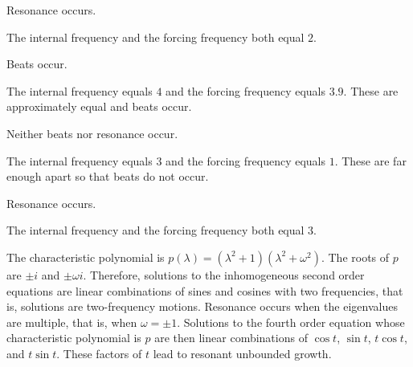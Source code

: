   \ans Resonance occurs.

\soln  The internal frequency and the forcing frequency both equal $2$.

\newpage
{} \ans Beats occur.

\soln  The internal frequency equals $4$ and the forcing frequency equals
$3.9$.  These are approximately equal and beats occur.

 \ans Neither beats nor resonance occur.

The internal frequency equals $3$ and the forcing frequency equals
$1$. These are far enough apart so that beats do not occur.

 \ans Resonance occurs.

\soln  The internal frequency and the forcing frequency both equal $3$.


The characteristic polynomial is $p(\lambda)=(\lambda^2+1)(\lambda^2+\omega^2)$. 
The roots of $p$ are $\pm i$ and $\pm\omega i$.  Therefore, solutions to the
inhomogeneous second order equations are linear combinations of sines and cosines with
two frequencies, that is, solutions are two-frequency motions.  Resonance occurs
when the eigenvalues are multiple, that is, when $\omega=\pm 1$.  Solutions to the
fourth order equation whose characteristic polynomial is $p$ are then linear
combinations of $\cos t$, $\sin t$, $t\cos t$, and $t\sin t$.  These factors of $t$ 
lead to resonant unbounded growth.
